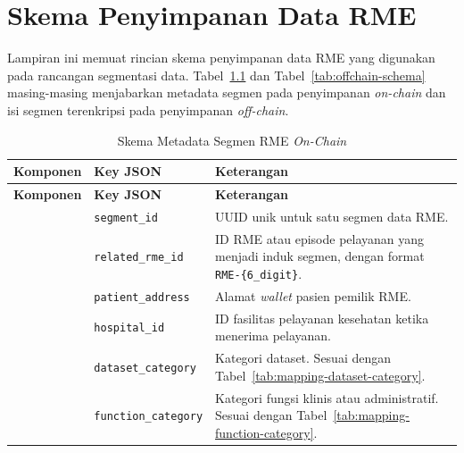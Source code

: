 \chapter{Skema Penyimpanan Data RME}
\label{lampiran:skema-penyimpanan-rme}

Lampiran ini memuat rincian skema penyimpanan data RME yang digunakan pada rancangan segmentasi data. Tabel~\ref{tab:onchain-schema} dan Tabel~\ref{tab:offchain-schema} masing-masing menjabarkan metadata segmen pada penyimpanan \textit{on-chain} dan isi segmen terenkripsi pada penyimpanan \textit{off-chain}.

\begin{longtable}{|>{\raggedright\arraybackslash}p{2.8cm}|>{\raggedright\arraybackslash}p{4.0cm}|>{\raggedright\arraybackslash}p{5.4cm}|}
	\caption{Skema Metadata Segmen RME \textit{On-Chain}} \label{tab:onchain-schema}                                                              \\
	\hline
	\textbf{Komponen} & \textbf{Key JSON}                                                                                   & \textbf{Keterangan} \\
	\hline
	\endfirsthead
	\hline
	\textbf{Komponen} & \textbf{Key JSON}                                                                                   & \textbf{Keterangan} \\
	\hline
	\endhead

	\multirow{4}{2.8cm}{\textbf{Identitas Segmen}}
	                  & \texttt{segment\_id}
	                  & UUID unik untuk satu segmen data RME.                                                                                     \\ \cline{2-3}
	                  & \texttt{related\_rme\_id}
	                  & ID RME atau episode pelayanan yang menjadi induk segmen, dengan format \verb|RME-{6_digit}|.                              \\ \cline{2-3}
	                  & \texttt{patient\_address}
	                  & Alamat \textit{wallet} pasien pemilik RME.                                                                                \\ \cline{2-3}
	                  & \texttt{hospital\_id}
	                  & ID fasilitas pelayanan kesehatan ketika menerima pelayanan.                                                               \\ \hline

	\multirow{2}{2.8cm}{\textbf{Kategori Data}}
	                  & \texttt{dataset\_category}
	                  & Kategori dataset. Sesuai dengan Tabel~\ref{tab:mapping-dataset-category}.                                                 \\ \cline{2-3}
	                  & \texttt{function\_category}
	                  & Kategori fungsi klinis atau administratif. Sesuai dengan Tabel~\ref{tab:mapping-function-category}.                       \\ \hline


\end{longtable}
